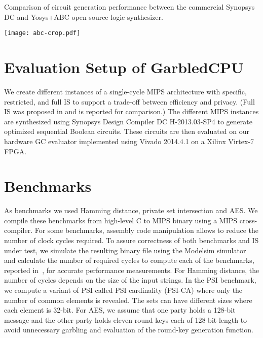 \begin{table}[ht]
\caption{Comparison of circuit generation performance between the commercial Synopsys DC and Yosys+ABC open source logic synthesizer.}
\label{table:abc}
\centering
\texttt{[image: abc-crop.pdf]}
\end{table}

\section{Evaluation Setup of GarbledCPU}\label{ssect:evalset}
We create different instances of a single-cycle MIPS architecture with specific, restricted, and full IS to support a trade-off between efficiency and privacy. (Full IS was proposed in \cite{songhori2015tinygarble} and is reported for comparison.) The different MIPS instances are synthesized using Synopsys Design Compiler DC H-2013.03-SP4 to generate optimized sequential Boolean circuits. These circuits are then evaluated on our hardware GC evaluator implemented using Vivado 2014.4.1 on a Xilinx Virtex-7 FPGA.

\section{Benchmarks}\label{ssect:bench}
As benchmarks we used Hamming distance, private set intersection and AES. We compile these benchmarks from high-level C to MIPS binary using a MIPS cross-compiler. For some benchmarks, assembly code manipulation allows to reduce the number of clock cycles required. To assure correctness of both benchmarks and IS under test, we simulate the resulting binary file using the Modelsim simulator and calculate the number of required cycles to compute each of the benchmarks, reported in~, for accurate performance measurements. For Hamming distance, the number of cycles depends on the size of the input strings. In the PSI benchmark, we compute a variant of PSI called PSI cardinality (PSI-CA) where only the number of common elements is revealed. The sets can have different sizes where each element is 32-bit.  For AES, we assume that one party holds a 128-bit message and the other party holds eleven round keys each of 128-bit length to avoid unnecessary garbling and evaluation of the round-key generation function.

